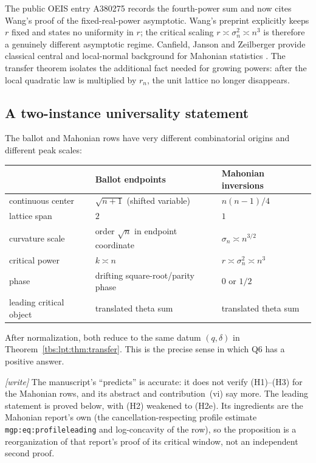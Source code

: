 \documentclass[11pt,a4paper]{article}
\numberwithin{equation}{section}
\theoremstyle{definition}
\newcommand{\code}[1]{\texttt{#1}}
\begin{document}
The public OEIS entry A380275 records the fourth-power sum and now cites
Wang's proof of the fixed-real-power asymptotic. Wang's preprint
explicitly keeps $r$ fixed and states no uniformity in $r$; the critical
scaling $r\asymp\sigma_n^2\asymp n^3$ is therefore a genuinely different
asymptotic regime. Canfield, Janson and Zeilberger provide classical
central and local-normal background for Mahonian statistics
\cite{lptCJZ}. The transfer theorem isolates the additional fact needed
for growing powers: after the local quadratic law is multiplied by $r_n$,
the unit lattice no longer disappears.

\subsection{A two-instance universality statement}\label{tbs:lpt:sec:two-instance}
The ballot and Mahonian rows have very different combinatorial origins
and different peak scales:
\begin{center}
\small
\begin{tabular}{@{}lll@{}}
\toprule
 & Ballot endpoints & Mahonian inversions\\
\midrule
continuous center & $\sqrt{n+1}$ (shifted variable) & $n(n-1)/4$\\
lattice span & $2$ & $1$\\
curvature scale & order $\sqrt n$ in endpoint coordinate & $\sigma_n\asymp n^{3/2}$\\
critical power & $k\asymp n$ & $r\asymp\sigma_n^2\asymp n^3$\\
phase & drifting square-root/parity phase & $0$ or $1/2$\\
leading critical object & translated theta sum & translated theta sum\\
\bottomrule
\end{tabular}
\end{center}
After normalization, both reduce to the same datum $(q,\delta)$ in
Theorem~\ref{tbs:lpt:thm:transfer}. This is the precise sense in which Q6
has a positive answer.

\emph{[write]} The manuscript's ``predicts'' is accurate: it does not
verify (H1)--(H3) for the Mahonian rows, and its abstract and
contribution~(vi) say more. The leading statement is proved below, with
(H2) weakened to (H2e). Its ingredients are the Mahonian report's own
(the cancellation-respecting profile estimate
\code{mgp:eq:profileleading} and log-concavity of the row), so the
proposition is a reorganization of that report's proof of its
critical window, not an independent second proof.
\end{document}
